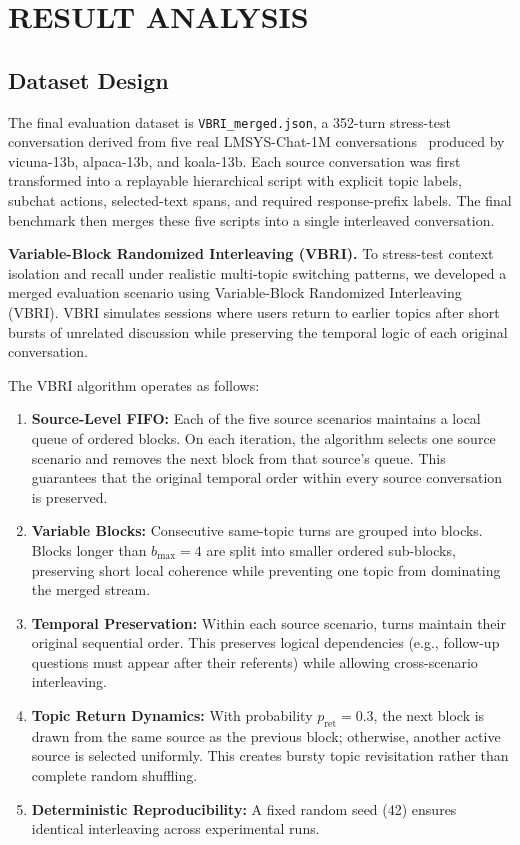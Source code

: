\chapter{RESULT ANALYSIS}\label{sec4}
\vspace{-3em}

\section{Dataset Design}\label{subsubsec:dataset}

The final evaluation dataset is \texttt{VBRI\_merged.json}, a 352-turn stress-test conversation derived from five real LMSYS-Chat-1M conversations~\cite{zheng2024lmsyschat} produced by vicuna-13b, alpaca-13b, and koala-13b. Each source conversation was first transformed into a replayable hierarchical script with explicit topic labels, subchat actions, selected-text spans, and required response-prefix labels. The final benchmark then merges these five scripts into a single interleaved conversation.

\textbf{Variable-Block Randomized Interleaving (VBRI).}
To stress-test context isolation and recall under realistic multi-topic switching patterns, we developed a merged evaluation scenario using Variable-Block Randomized Interleaving (VBRI). VBRI simulates sessions where users return to earlier topics after short bursts of unrelated discussion while preserving the temporal logic of each original conversation.

The VBRI algorithm operates as follows:
\begin{enumerate}
    \item \textbf{Source-Level FIFO:} Each of the five source scenarios maintains a local queue of ordered blocks. On each iteration, the algorithm selects one source scenario and removes the next block from that source's queue. This guarantees that the original temporal order within every source conversation is preserved.
    \item \textbf{Variable Blocks:} Consecutive same-topic turns are grouped into blocks. Blocks longer than $b_{\max}{=}4$ are split into smaller ordered sub-blocks, preserving short local coherence while preventing one topic from dominating the merged stream.
    \item \textbf{Temporal Preservation:} Within each source scenario, turns maintain their original sequential order. This preserves logical dependencies (e.g., follow-up questions must appear after their referents) while allowing cross-scenario interleaving.
    \item \textbf{Topic Return Dynamics:} With probability $p_{\text{ret}}{=}0.3$, the next block is drawn from the same source as the previous block; otherwise, another active source is selected uniformly. This creates bursty topic revisitation rather than complete random shuffling.
    \item \textbf{Deterministic Reproducibility:} A fixed random seed (42) ensures identical interleaving across experimental runs.
\end{enumerate}

